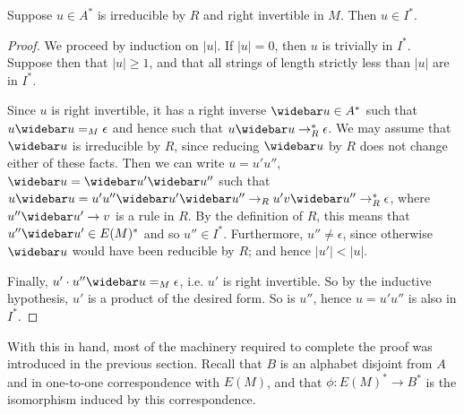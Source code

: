 \documentclass[noindex,noinsetproof,emphthm,12pt]{lmaths}
\begin{document}
\begin{lemma}
	Suppose $u \in A^*$ is irreducible by $R$ and right invertible in $M$. Then $u \in I^*$. \label{lma:factor-I*}
\end{lemma}
\begin{proof}
	We proceed by induction on $|u|$. If $|u| = 0$, then $u$ is trivially in $I^*$. Suppose then that $|u| \ge 1$, and that all strings of length strictly less than $|u|$ are in $I^*$.

	Since $u$ is right invertible, it has a right inverse $\widebar u \in A^*$ such that $u\widebar u =_M \epsilon$ and hence such that $u\widebar u \to_R^* \epsilon$. We may assume that $\widebar u$ is irreducible by $R$, since reducing $\widebar u$ by $R$ does not change either of these facts. Then we can write $u = u'u''$, $\widebar u = \widebar u'\widebar u''$ such that $u\widebar u = u'u''\widebar u'\widebar u'' \to_R u'v\widebar u'' \to_R^* \epsilon$, where $u''\widebar u' \to v$ is a rule in $R$. By the definition of $R$, this means that $u''\widebar u' \in E(M)^*$ and so $u'' \in I^*$. Furthermore, $u'' \ne \epsilon$, since otherwise $\widebar u$ would have been reducible by $R$; and hence $|u'| < |u|$.

	Finally, $u' \cdot u''\widebar u =_M \epsilon$, i.e. $u'$ is right invertible. So by the inductive hypothesis, $u'$ is a product of the desired form. So is $u''$, hence $u = u'u''$ is also in $I^*$.
\end{proof}

With this in hand, most of the machinery required to complete the proof was introduced in the previous section. Recall that $B$ is an alphabet disjoint from $A$ and in one-to-one correspondence with $E(M)$, and that $\phi : E(M)^* \to B^*$ is the isomorphism induced by this correspondence.
\end{document}
